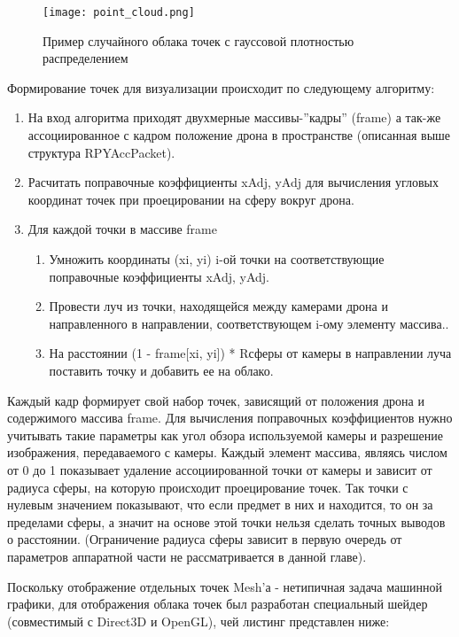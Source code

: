 \begin{figure}[ht]
\centering
    \centering
    \texttt{[image: point\_cloud.png]}  
  \caption{Пример случайного облака точек с гауссовой плотностью распределением}
  \label{fig:point_cloud}
\end{figure}

Формирование точек для визуализации происходит по следующему алгоритму:
\begin{enumerate}
\item На вход алгоритма приходят двухмерные массивы-''кадры'' (frame) а так-же ассоциированное с кадром положение дрона в пространстве (описанная выше структура RPYAccPacket).
\item Расчитать поправочные коэффициенты xAdj, yAdj для вычисления угловых координат точек при проецировании на сферу вокруг дрона.
\item Для каждой точки в массиве frame
  \begin{enumerate}
  \item Умножить координаты (xi, yi) i-ой точки на соответствующие поправочные коэффициенты xAdj, yAdj.
  \item Провести луч из точки, находящейся между камерами дрона и направленного в направлении, соответствующем i-ому элементу массива..
  \item На расстоянии (1 - frame[xi, yi]) * Rсферы от камеры в направлении луча поставить точку и добавить ее на облако.
  \end{enumerate}
\end{enumerate}

Каждый кадр формирует свой набор точек, зависящий от положения дрона и содержимого массива frame. Для вычисления поправочных коэффициентов нужно учитывать такие параметры как угол обзора используемой камеры и разрешение изображения, передаваемого с камеры. Каждый элемент массива, являясь числом от 0 до 1 показывает удаление ассоциированной точки от камеры и зависит от радиуса сферы, на которую происходит проецирование точек. Так точки с нулевым значением показывают, что если предмет в них и находится, то он за пределами сферы, а значит на основе этой точки нельзя сделать точных выводов о расстоянии. (Ограничение радиуса сферы зависит в первую очередь от параметров аппаратной части не рассматривается в данной главе).

Поскольку отображение отдельных точек Mesh'а - нетипичная задача машинной графики, для отображения облака точек был разработан специальный шейдер (совместимый с Direct3D и OpenGL), чей листинг представлен ниже:


